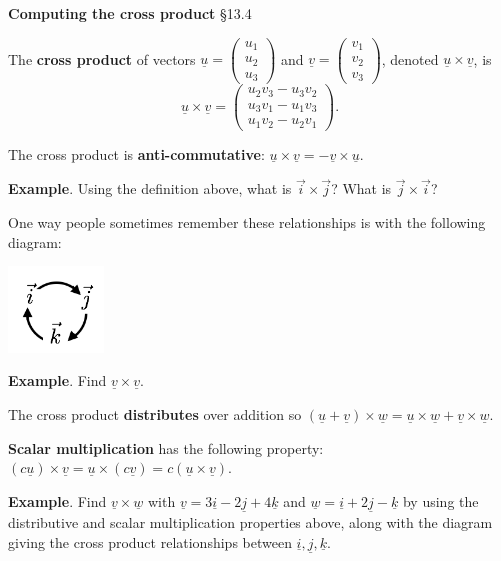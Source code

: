 \documentclass[12pt,letterpaper,noanswers]{exam}
\newcommand{\mb}[1]{\underline{#1}}
\begin{document}
\noindent\textbf{Computing the cross product} \S 13.4
\begin{tcolorbox}
The \textbf{cross product} of vectors $\mb{u} = \left(\begin{array}{c} u_1 \\ u_2 \\ u_3 \end{array}\right)$ and $\mb{v} = \left(\begin{array}{c} v_1 \\ v_2 \\ v_3 \end{array}\right)$, denoted $\mb{u}\times\mb{v}$, is \[\mb{u}\times\mb{v} = \left(\begin{array}{c} u_2v_3-u_3v_2 \\ u_3v_1-u_1v_3 \\ u_1v_2 - u_2v_1 \end{array}\right).\]

The cross product is \textbf{anti-commutative}: $\mb{u}\times\mb{v} = -\mb{v}\times\mb{u}$.
\end{tcolorbox}

\noindent\textbf{Example}.
Using the definition above, what is $\vec{i}\times\vec{j}$? What is $\vec{j}\times\vec{i}$?

\vspace{1in}



One way people sometimes remember these relationships is with the following diagram:

\includegraphics[width=1in]{img/C09ijk.png}

\noindent\textbf{Example}.
Find $\mb{v} \times \mb{v}$.
\vspace{1.2in}

\begin{tcolorbox}
The cross product \textbf{distributes} over addition so $(\mb{u}+\mb{v})\times \mb{w} = \mb{u}\times\mb{w}+\mb{v}\times\mb{w}$.

\textbf{Scalar multiplication} has the following property: $(c\mb{u})\times\mb{v} = \mb{u}\times(c\mb{v}) = c(\mb{u}\times\mb{v})$.
\end{tcolorbox}

\noindent\textbf{Example}.
Find $\mb{v} \times \mb{w}$ with $\mb{v} = 3\mb{i} - 2\mb{j} + 4\mb{k}$ and $\mb{w} = \mb{i} + 2\mb{j} - \mb{k}$ by using the distributive and scalar multiplication properties above, along with the diagram giving the cross product relationships between $\mb{i},\mb{j},\mb{k}$.
\vspace{2in}
\end{document}
